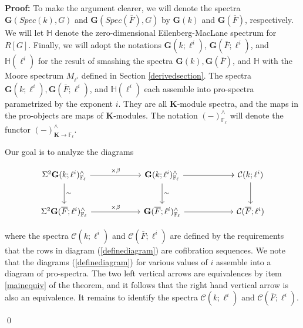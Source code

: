 \documentclass[11pt]{article}
\newcommand\mb{\mathbb}
\newcommand\mc{\mathcal}
\def \bK{\mathbf K}
\newcommand\mfk{\mathbf G}
\newenvironment{Proof}{\par\noindent\textbf{Proof:}}
{\qed}
\begin{document}
\begin{Proof}
 To make the argument clearer, we will denote the spectra $\mfk(Spec(k), G) $ and $\mfk(Spec(\overline{F}), G)$ by $\mfk(k)$ and $\mfk(\overline{F})$, respectively.  We will let $\mb{H}$ denote the zero-dimensional Eilenberg-MacLane spectrum for $R[G]$.  Finally, we will adopt the notations $\mfk(k; \ell ^i)$, $\mfk(\overline{F} ; \ell^i)$, and $\mb{H}(\ell ^i) $ for the result of smashing the spectra $\mfk(k), \mfk(\overline{F})$, and $\mb{H}$ with the Moore spectrum $M_{\ell ^i}$ defined in Section \ref{derivedsection}. The spectra $\mfk(k;\ell ^i), \mfk(\overline{F}; \ell ^i)$, and $\mb{H} (\ell ^i) $ each assemble into pro-spectra parametrized by the exponent $i$.  They are all $\bK$-module spectra, and the maps in the pro-objects are maps of $\bK$-modules. The notation $(-)^{\wedge}_{\mb{F}_{\ell}}$ will denote the functor $(-)^{\wedge}_{\bK \rightarrow \mb{F}_{\ell}}$. 

 Our goal is to analyze the diagrams 
 \begin{center} \vspace{-1cm}
\begin{equation} \label{definediagram}
\begin{tikzcd}[row sep=2.5em, column sep=6em]
\Sigma ^2 \mfk(k; \ell ^i)^{\wedge}_{\mb{F}_{\ell}} \arrow[d,"\sim"]
\arrow[r, "\times \beta"] 
& \mfk(k; \ell ^i)^{\wedge}_{\mb{F}_{\ell}} \arrow[d,"\sim"] \arrow[r] \arrow[r] & \mc{C}(k; \ell ^i ) \arrow[d]
 \\
\Sigma ^2 \mfk(\overline{F} ; \ell ^i)^{\wedge}_{\mb{F}_{\ell}}
\arrow[r, "\times \beta"] 
&   \mfk(\overline{F}; \ell ^i)^{\wedge}_{\mb{F}_{\ell}} \arrow[r] &\mc{C}(\overline{F};\ell ^i )
\end{tikzcd}
\end{equation}
\end{center}
where the spectra $\mc{C}(k; \ell ^i)$ and $\mc{C}(\overline{F}; \ell ^i)$ are defined by the requirements that the rows in diagram (\ref{definediagram}) are cofibration sequences. We note that the diagrams (\ref{definediagram}) for various values of $i$ assemble into a diagram of pro-spectra.   The two left vertical arrows are equivalences by item \ref{mainequiv} of the theorem, and it follows that the right hand vertical arrow is also an equivalence.  It remains to identify the spectra $\mc{C}(k ; \ell^i)$ and $\mc{C}(\overline{F} ; \ell^i)$. 


\end{Proof}
\end{document}
